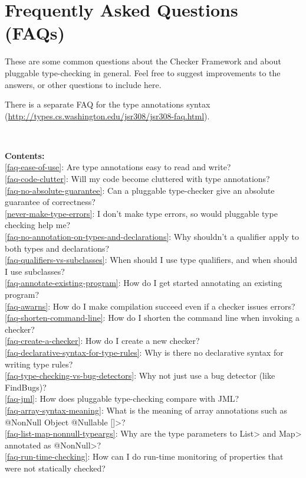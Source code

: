\htmlhr
\chapter{Frequently Asked Questions (FAQs)\label{faq}}

These are some common questions about the Checker Framework and about
pluggable type-checking in general.  Feel free to suggest improvements to
the answers, or other questions to include here.

There is a separate FAQ for the type annotations syntax
(\url{http://types.cs.washington.edu/jsr308/jsr308-faq.html}).


~

\noindent
\textbf{Contents:} \\
\ref{faq-ease-of-use}: Are type annotations easy to read and write? \\
\ref{faq-code-clutter}: Will my code become cluttered with type annotations? \\
\ref{faq-no-absolute-guarantee}: Can a pluggable type-checker give an absolute guarantee of correctness? \\
\ref{never-make-type-errors}: I don't make type errors, so would pluggable type checking help me? \\
\ref{faq-no-annotation-on-types-and-declarations}: Why shouldn't a qualifier apply to both types and declarations? \\
\ref{faq-qualifiers-vs-subclasses}: When should I use type qualifiers, and when should I use subclasses? \\
\ref{faq-annotate-existing-program}: How do I get started annotating an existing program? \\
\ref{faq-awarns}: How do I make compilation succeed even if a checker issues errors? \\
\ref{faq-shorten-command-line}: How do I shorten the command line when invoking a checker? \\
\ref{faq-create-a-checker}: How do I create a new checker? \\
\ref{faq-declarative-syntax-for-type-rules}: Why is there no declarative syntax for writing type rules? \\
\ref{faq-type-checking-vs-bug-detectors}: Why not just use a bug detector (like FindBugs)? \\
\ref{faq-jml}: How does pluggable type-checking compare with JML? \\
\ref{faq-array-syntax-meaning}: What is the meaning of array annotations such as \<@NonNull Object @Nullable []>? \\
\ref{faq-list-map-nonnull-typeargs}: Why are the type parameters to \<List> and \<Map> annotated as \<@NonNull>? \\
\ref{faq-run-time-checking}: How can I do run-time monitoring of properties that were not statically checked?



